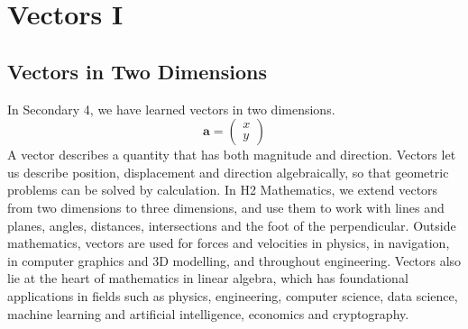 \documentclass[a4paper]{book}
\newcommand{\cv}[2]{\begin{pmatrix}#1\\#2\end{pmatrix}}
\begin{document}
\setcounter{chapter}{\numexpr\chapnum-1\relax}
\chapter{Vectors I}
\localtableofcontents
\clearpage
\section{Vectors in Two Dimensions}
In Secondary 4, we have learned vectors in two dimensions.
\[
\mathbf a=\cv{x}{y}
\]
A vector describes a quantity that has both magnitude and direction. Vectors let us describe position, displacement and direction algebraically, so that geometric problems can be solved by calculation. In H2 Mathematics, we extend vectors from two dimensions to three dimensions, and use them to work with lines and planes, angles, distances, intersections and the foot of the perpendicular. Outside mathematics, vectors are used for forces and velocities in physics, in navigation, in computer graphics and 3D modelling, and throughout engineering. Vectors also lie at the heart of mathematics in linear algebra, which has foundational applications in fields such as physics, engineering, computer science, data science, machine learning and artificial intelligence, economics and cryptography.

\medskip

\begin{center}
\end{center}
\end{document}
